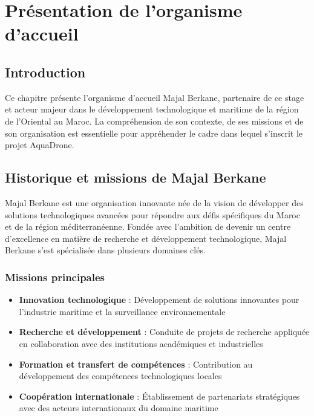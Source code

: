 \chapter[Présentation de l'organisme d'accueil]{Présentation de l'organisme d'accueil}
\label{cp:presentation-organisme}

{
\parindent0pt

\section{Introduction}
Ce chapitre présente l'organisme d'accueil Majal Berkane, partenaire de ce stage et acteur majeur dans le développement technologique et maritime de la région de l'Oriental au Maroc. La compréhension de son contexte, de ses missions et de son organisation est essentielle pour appréhender le cadre dans lequel s'inscrit le projet AquaDrone.

\section{Historique et missions de Majal Berkane}
Majal Berkane est une organisation innovante née de la vision de développer des solutions technologiques avancées pour répondre aux défis spécifiques du Maroc et de la région méditerranéenne. Fondée avec l'ambition de devenir un centre d'excellence en matière de recherche et développement technologique, Majal Berkane s'est spécialisée dans plusieurs domaines clés.

\subsection{Missions principales}
\begin{itemize}
    \item \textbf{Innovation technologique} : Développement de solutions innovantes pour l'industrie maritime et la surveillance environnementale
    \item \textbf{Recherche et développement} : Conduite de projets de recherche appliquée en collaboration avec des institutions académiques et industrielles
    \item \textbf{Formation et transfert de compétences} : Contribution au développement des compétences technologiques locales
    \item \textbf{Coopération internationale} : Établissement de partenariats stratégiques avec des acteurs internationaux du domaine maritime
\end{itemize}

}
